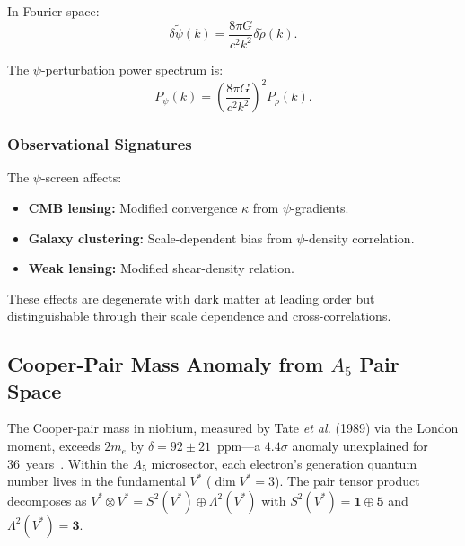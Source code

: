 In Fourier space:
\begin{equation}
\delta\tilde{\psi}(k) = \frac{8\pi G}{c^2 k^2}\delta\tilde{\rho}(k).
\end{equation}

The $\psi$-perturbation power spectrum is:
\begin{equation}
P_\psi(k) = \left(\frac{8\pi G}{c^2 k^2}\right)^2 P_\rho(k).
\end{equation}

\subsubsection{Observational Signatures}

The $\psi$-screen affects:
\begin{itemize}
\item \textbf{CMB lensing:} Modified convergence $\kappa$ from $\psi$-gradients.
\item \textbf{Galaxy clustering:} Scale-dependent bias from $\psi$-density correlation.
\item \textbf{Weak lensing:} Modified shear-density relation.
\end{itemize}

These effects are degenerate with dark matter at leading order but 
distinguishable through their scale dependence and cross-correlations.

\subsection{Cooper-Pair Mass Anomaly from $A_5$ Pair Space}\label{app:cooper-pair}

The Cooper-pair mass in niobium, measured by Tate \textit{et al.}
(1989) via the London moment, exceeds $2m_e$ by
$\delta = 92 \pm 21$~ppm---a $4.4\sigma$ anomaly unexplained for
36~years~\cite{AlcockCooperPair2026}.  Within the $A_5$ microsector, each electron's generation
quantum number lives in the fundamental $V^*$ ($\dim V^* = 3$).
The pair tensor product decomposes as
$V^* \otimes V^* = S^2(V^*) \oplus \Lambda^2(V^*)$ with
$S^2(V^*) = \mathbf{1} \oplus \mathbf{5}$ and
$\Lambda^2(V^*) = \mathbf{3}$.

